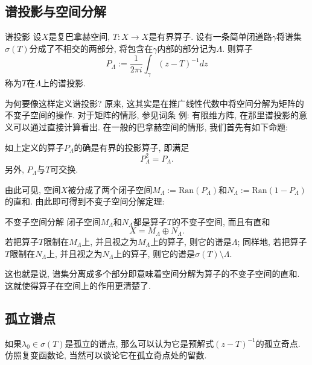 

\subsection{谱投影与空间分解}
\begin{definition}{谱投影}
设$X$是复巴拿赫空间, $T:X\to X$是有界算子. 设有一条简单闭道路$\gamma$将谱集$\sigma(T)$分成了不相交的两部分, 将包含在$\gamma$内部的部分记为$\Lambda$. 则算子
$$
P_\Lambda:=\frac{1}{2\pi i}\int_\gamma(z-T)^{-1}dz
$$
称为$T$在$\Lambda$上的谱投影.
\end{definition}

为何要像这样定义谱投影? 原来, 这其实是在推广线性代数中将空间分解为矩阵的不变子空间的操作. 对于矩阵的情形, 参见词条 例: 有限维方阵, 在那里谱投影的意义可以通过直接计算看出. 在一般的巴拿赫空间的情形, 我们首先有如下命题:

\begin{lemma}{}
如上定义的算子$P_\Lambda$的确是有界的投影算子, 即满足
$$
P_\Lambda^2=P_\Lambda.
$$
另外, $P_\Lambda$与$T$可交换.
\end{lemma}

由此可见, 空间$X$被分成了两个闭子空间$M_\Lambda:=\text{Ran}(P_\Lambda)$和$N_\Lambda:=\text{Ran}(1-P_\Lambda)$的直和. 由此即可得到不变子空间分解定理:

\begin{theorem}{不变子空间分解}
闭子空间$M_\Lambda$和$N_\Lambda$都是算子$T$的不变子空间, 而且有直和
$$
X=M_\Lambda\oplus N_\Lambda.
$$
若把算子$T$限制在$M_\Lambda$上, 并且视之为$M_\Lambda$上的算子, 则它的谱是$\Lambda$; 同样地, 若把算子$T$限制在$N_\Lambda$上, 并且视之为$N_\Lambda$上的算子, 则它的谱是$\sigma(T)\setminus\Lambda$.
\end{theorem}

这也就是说, 谱集分离成多个部分即意味着空间分解为算子的不变子空间的直和. 这就使得算子在空间上的作用更清楚了.

\subsection{孤立谱点}
如果$\lambda_0\in\sigma(T)$是孤立的谱点, 那么可以认为它是预解式$(z-T)^{-1}$的孤立奇点. 仿照复变函数论, 当然可以谈论它在孤立奇点处的留数.
